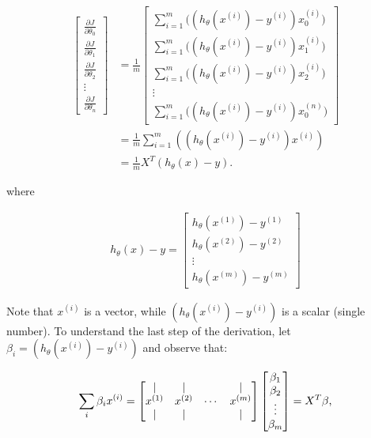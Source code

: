 \documentclass[12pt]{article}
\begin{document}
\begin{align}
  \label{eq:vector}
   \begin{bmatrix} \frac{\partial J}{\partial \theta_0} \\[0.5em] \frac{\partial J}{\partial \theta_1} \\[0.5em] \frac{\partial J}{\partial \theta_2} \\[0.5em] \vdots \\[0.5em] \frac{\partial J}{\partial \theta_n} \end{bmatrix} & = \frac{1}{m} \begin{bmatrix} \sum_{i=1}^m{\big((h_\theta(x^{(i)})-y^{(i)})x_0^{(i)}\big)} \\[0.5em]\sum_{i=1}^m{\big((h_\theta(x^{(i)})-y^{(i)})x_1^{(i)}\big)} \\[0.5em] \sum_{i=1}^m{\big((h_\theta(x^{(i)})-y^{(i)})x_2^{(i)}\big)} \\[0.5em] \vdots \\[0.5em] \sum_{i=1}^m{\big((h_\theta(x^{(i)})-y^{(i)})x_0^{(n)}\big)} \end{bmatrix} \\[0.5em]
  & = \frac{1}{m}\sum_{i=1}^m{((h_\theta(x^{(i)})-y^{(i)})x^{(i)})} \\
  & = \frac{1}{m}X^T(h_\theta(x) - y).
\end{align}

where

\begin{align}
  h_\theta(x) - y = \begin{bmatrix} h_\theta(x^{(1)}) - y^{(1)} \\ h_\theta(x^{(2)}) - y^{(2)} \\ \vdots \\ h_\theta(x^{(m)}) - y^{(m)}  \end{bmatrix}
\end{align}

Note that $x^{(i)}$ is a vector, while $(h_\theta(x^{(i)}) - y^{(i)})$ is a scalar (single number). To understand the last step of the derivation, let $\beta_i = (h_\theta(x^{(i)}) - y^{(i)})$ and observe that:

\begin{align}
  \sum_{i}{\beta_i x^{(i)}} = \begin{bmatrix} \text{\textbar} & \text{\textbar} & & \text{\textbar} \\
  x^{(1)} & x^{(2)} & \cdots & x^{(m)} \\
  \text{\textbar} & \text{\textbar} & & \text{\textbar} 
  \end{bmatrix}
  \begin{bmatrix}
    \beta_1 \\ \beta_2 \\ \vdots \\ \beta_m
  \end{bmatrix} = X^T \beta\text{,}
\end{align}
\end{document}
